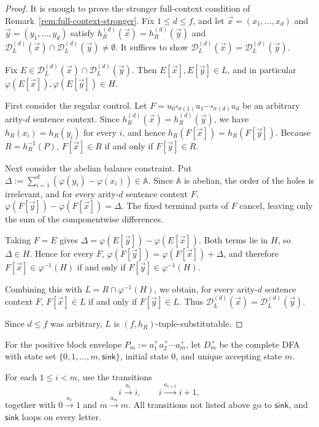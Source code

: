 \documentclass[11pt,a4paper]{article}
\numberwithin{equation}{section}
\theoremstyle{plain}
\theoremstyle{definition}
\theoremstyle{remark}
\newcommand{\D}{\mathcal{D}}
\newcommand{\tuple}[1]{\vec{#1}}
\newcommand{\blank}{\square}
\begin{document}
\begin{proof}
It is enough to prove the stronger full-context condition of
Remark~\ref{rem:full-context-stronger}.  Fix \(1\le d\le f\), and let
\(\tuple{x}=(x_1,\ldots,x_d)\) and
\(\tuple{y}=(y_1,\ldots,y_d)\) satisfy
\(h_R^{(d)}(\tuple{x})=h_R^{(d)}(\tuple{y})\) and
\(\D_L^{(d)}(\tuple{x})\cap\D_L^{(d)}(\tuple{y})\ne\emptyset\).
It suffices to show
\(\D_L^{(d)}(\tuple{x})=\D_L^{(d)}(\tuple{y})\).

Fix
\(E\in\D_L^{(d)}(\tuple{x})\cap\D_L^{(d)}(\tuple{y})\).
Then \(E[\tuple{x}],E[\tuple{y}]\in L\), and in particular
\(\varphi(E[\tuple{x}]),\varphi(E[\tuple{y}])\in H\).

First consider the regular control.
Let
\(F=u_0\blank_{\sigma(1)}u_1\cdots
\blank_{\sigma(d)}u_d\)
be an arbitrary arity-\(d\) sentence context.
Since
\(h_R^{(d)}(\tuple{x})=h_R^{(d)}(\tuple{y})\),
we have \(h_R(x_i)=h_R(y_i)\) for every \(i\), and hence
\(h_R(F[\tuple{x}])=h_R(F[\tuple{y}])\).
Because \(R=h_R^{-1}(P)\),
\(F[\tuple{x}]\in R\) if and only if \(F[\tuple{y}]\in R\).

Next consider the abelian balance constraint.
Put
\(\Delta:=\sum_{i=1}^d(\varphi(y_i)-\varphi(x_i))\in\mathbb A\).
Since \(\mathbb A\) is abelian, the order of the holes is irrelevant, and for every
arity-\(d\) sentence context \(F\),
\(\varphi(F[\tuple{y}])-\varphi(F[\tuple{x}])=\Delta\).
The fixed terminal parts of \(F\) cancel, leaving only the sum of the
componentwise differences.

Taking \(F=E\) gives
\(\Delta=\varphi(E[\tuple{y}])-\varphi(E[\tuple{x}])\).
Both terms lie in \(H\), so \(\Delta\in H\).
Hence for every \(F\),
\(\varphi(F[\tuple{y}])=\varphi(F[\tuple{x}])+\Delta\), and therefore
\(F[\tuple{x}]\in\varphi^{-1}(H)\) if and only if
\(F[\tuple{y}]\in\varphi^{-1}(H)\).

Combining this with \(L=R\cap\varphi^{-1}(H)\), we obtain, for every
arity-\(d\) sentence context \(F\),
\(F[\tuple{x}]\in L\) if and only if \(F[\tuple{y}]\in L\).
Thus
\(\D_L^{(d)}(\tuple{x})=\D_L^{(d)}(\tuple{y})\).

Since \(d\le f\) was arbitrary, \(L\) is
\((f,h_R)\)-tuple-substitutable.
\end{proof}


For the positive block envelope
\(P_m:=a_1^+a_2^+\cdots a_m^+\),
let \(D_m^+\) be the complete DFA with state set
\(\{0,1,\ldots,m,\mathsf{sink}\}\),
initial state \(0\), and unique accepting state \(m\).

For each \(1\le i<m\), use the transitions
\[
  i\xrightarrow{a_i}i,
  \qquad
  i\xrightarrow{a_{i+1}}i+1,
\]
together with
\(0\xrightarrow{a_1}1\) and
\(m\xrightarrow{a_m}m\).
All transitions not listed above go to \(\mathsf{sink}\), and
\(\mathsf{sink}\) loops on every letter.
\end{document}
